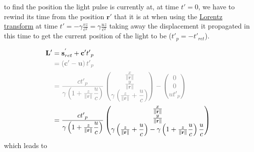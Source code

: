 to find the position the light pulse is currently at, at time ${t{'}} = 0$, we have to rewind its time from the position $\mathbf{r}{'}$ that it is at when using the \hyperlink{def-lorentz-transform}{Lorentz transform} at time ${t{'}} =-{\gamma}\frac{{v}{z}}{{c}^2} = {\gamma}\frac{u z}{{c}^2}$ taking away the displacement it propagated in this time to get the current position of the light to be (${t{'}_{p}} =-{t{'}_{ret}}$).

\begin{equation}
	\begin{split}
		\mathbf{L}{'}
		 & = \mathbf{s}_{ret}^{'} + \mathbf{c}{'}t{'}_{p}
		\\
		 & \color{gray} = \left( \mathbf{c}{'}-\mathbf{u} \right)t{'}_{p}
		\\
		 & \color{gray} = \dfrac{{c}t{'}_{p}}{{\gamma}\left(1 + \frac{z}{\|\mathbf{r}\|} \dfrac{u}{c} \right)}
		\begin{pmatrix}
			\frac{x}{\|\mathbf{r}\|}                                        \\
			\frac{y}{\|\mathbf{r}\|}                                        \\
			{\gamma} \left( \frac{z}{\|\mathbf{r}\|} + \dfrac{u}{c} \right) \\
		\end{pmatrix}
		-
		\begin{pmatrix}
			0            \\
			0            \\
			u {t{'}_{p}} \\
		\end{pmatrix}
		\\
		 & = \dfrac{{c}t{'}_{p}}{{\gamma}\left(1 + \frac{z}{\|\mathbf{r}\|} \dfrac{u}{c} \right)}
		\begin{pmatrix}
			\frac{x}{\|\mathbf{r}\|}                                                                                                                     \\
			\frac{y}{\|\mathbf{r}\|}                                                                                                                     \\
			{\gamma} \left( \frac{z}{\|\mathbf{r}\|} + \dfrac{u}{c} \right)-{\gamma}\left(1 + \frac{z}{\|\mathbf{r}\|} \dfrac{u}{c} \right) \dfrac{u}{c} \\
		\end{pmatrix}
	\end{split}
\end{equation}
which leads to

